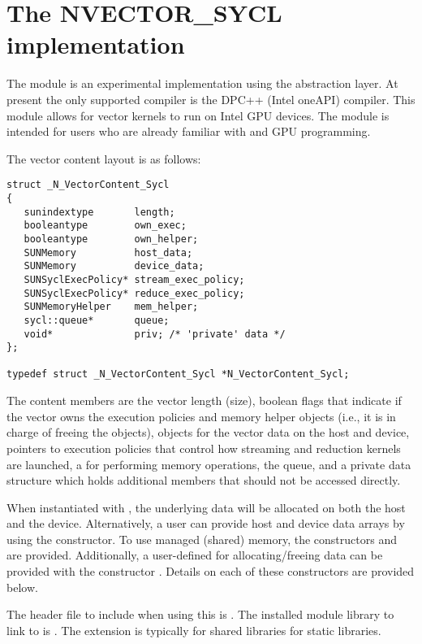 \section{The NVECTOR\_SYCL implementation}\label{ss:nvec_sycl}

The {\nvecsycl} module is an experimental {\nvector} implementation using the
\href{https://www.khronos.org/sycl/}{\sycl} abstraction layer.  At present the
only supported {\sycl} compiler is the DPC++ (Intel oneAPI) compiler. This module
allows for {\sundials} vector kernels to run on Intel GPU devices. The module is
intended for users who are already familiar with {\sycl} and GPU programming.

The vector content layout is as follows:
\begin{verbatim}
struct _N_VectorContent_Sycl
{
   sunindextype       length;
   booleantype        own_exec;
   booleantype        own_helper;
   SUNMemory          host_data;
   SUNMemory          device_data;
   SUNSyclExecPolicy* stream_exec_policy;
   SUNSyclExecPolicy* reduce_exec_policy;
   SUNMemoryHelper    mem_helper;
   sycl::queue*       queue;
   void*              priv; /* 'private' data */
};

typedef struct _N_VectorContent_Sycl *N_VectorContent_Sycl;
\end{verbatim}
The content members are the vector length (size), boolean flags that indicate
if the vector owns the execution policies and memory helper objects (i.e., it is
in charge of freeing the objects),  objects for the vector data on
the host and device, pointers to execution policies that control how streaming
and reduction kernels are launched, a  for performing memory
operations, the {\sycl} queue, and a private data structure which holds additional
members that should not be accessed directly.

When instantiated with , the underlying data will be
allocated on both the host and the device. Alternatively, a user can provide
host and device data arrays by using the  constructor.
To use managed (shared) memory, the constructors  and
\\ \noindent
{} are provided. Additionally, a user-defined
 for allocating/freeing data can be provided with the
constructor . Details on each of these
constructors are provided below.

The header file to include when using this is . The
installed module library to link to is . The
extension  is typically  for shared libraries  for
static libraries.

